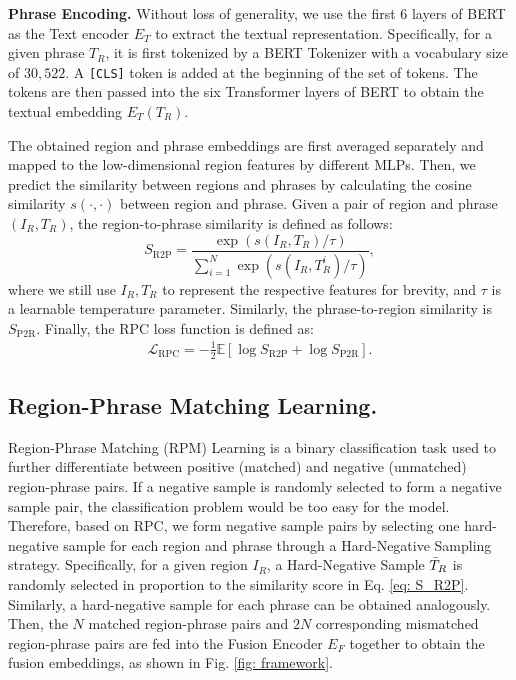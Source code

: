 \noindent\textbf{Phrase Encoding.}
Without loss of generality, we use the first 6 layers of BERT as the Text encoder $E_T$ to extract the textual representation. 
Specifically, for a given phrase $T_R$, it is first tokenized by a BERT Tokenizer with a vocabulary size of $30,522$. 
A \texttt{[CLS]} token is added at the beginning of the set of tokens.
The tokens are then passed into the six Transformer layers of BERT to obtain the textual embedding $E_T(T_R)$.


The obtained region and phrase embeddings are first averaged separately and mapped to the low-dimensional region features by different MLPs. 
Then, we predict the similarity between regions and phrases by calculating the cosine similarity $s(\cdot,\cdot)$ between region and phrase. 
Given a pair of region and phrase $(I_R, T_R)$, the region-to-phrase similarity is defined as follows:
\begin{equation}
\label{eq: S_R2P}
S_{\text{R2P}} = \frac{\exp(s(I_R, T_R)/\tau)}{\sum_{i=1}^{N}\exp(s(I_R, T_R^i)/\tau)},
\end{equation}
where we still use $I_R, T_R$ to represent the respective features for brevity, and $\tau$ is a learnable temperature parameter.
Similarly, the phrase-to-region similarity is $S_{\text{P2R}}$.
Finally, the RPC loss function is defined as:
\begin{equation}
\label{eq: L_PRC}
\begin{split}
\mathcal{L}_{\text{RPC}} = -\frac{1}{2} \mathbb{E}[\log S_{\text{R2P}} + \log S_{\text{P2R}}].
\end{split}
\end{equation}


\subsection{Region-Phrase Matching Learning.}
\noindent Region-Phrase Matching (RPM) Learning is a binary classification task used to further differentiate between positive (matched) and negative (unmatched) region-phrase pairs. 
If a negative sample is randomly selected to form a negative sample pair, the classification problem would be too easy for the model. 
Therefore, based on RPC, we form negative sample pairs by selecting one hard-negative sample for each region and phrase through a Hard-Negative Sampling strategy. 
Specifically, for a given region $I_R$, a Hard-Negative Sample $\Bar{T}_R$ is randomly selected in proportion to the similarity score in Eq. \ref{eq: S_R2P}. 
Similarly, a hard-negative sample for each phrase can be obtained analogously. 
Then, the $N$ matched region-phrase pairs and $2N$ corresponding mismatched region-phrase pairs are fed into the Fusion Encoder $E_F$ together to obtain the fusion embeddings, as shown in Fig. \ref{fig: framework}.

